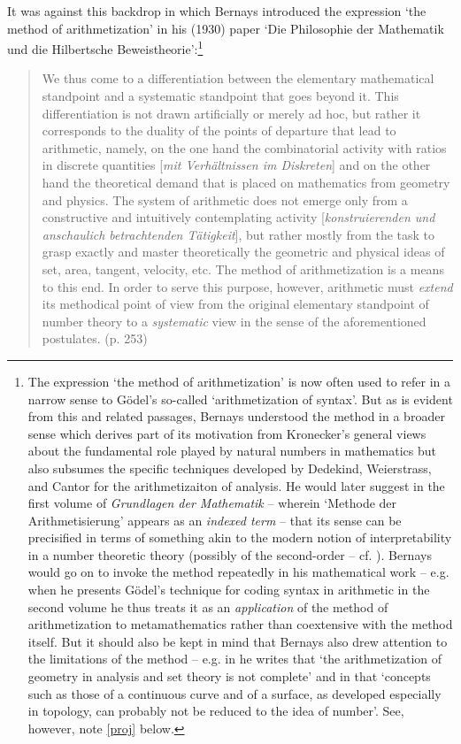 \documentclass[11pt,fleqn,leqno]{article}
\begin{document}
It was against this backdrop in which Bernays introduced the expression `the method of arithmetization' in his (1930) paper `Die Philosophie der Mathematik und die Hilbertsche Beweistheorie':\footnote{The expression `the method of arithmetization' is now often used to refer in a narrow sense to G\"odel's \citeyearpar{Godel1931a} so-called `arithmetization of syntax'.   But as is evident from this and related passages, Bernays understood the method in a broader sense which derives part of its motivation from Kronecker's general views about the fundamental role played by natural numbers in mathematics but also subsumes the specific techniques developed by Dedekind, Weierstrass, and Cantor for the arithmetizaiton of analysis.   He would later suggest in the first volume of \textsl{Grundlagen der Mathematik}  \citeyearpar[pp. 2-3, pp. 17-18]{Hilbert1934} -- wherein   `Methode der Arithmetisierung' appears as an \textsl{indexed term} -- that its sense can be precisified in terms of something akin to the modern notion of interpretability in a number theoretic theory (possibly of the second-order -- cf. \citealp[Sup. IV]{Hilbert1939}).   Bernays would go on to invoke the method repeatedly in his mathematical work -- e.g. when he presents G\"odel's  technique for coding syntax in arithmetic in the second volume \citeyearpar[\S 4]{Hilbert1939} he thus treats it as an \textsl{application} of the method of arithmetization to metamathematics rather than coextensive with the method itself.  But it should also be kept in mind that Bernays also drew attention to the limitations of the method -- e.g. in \citeyearpar[p. 152]{Bernays1941d} he writes that `the arithmetization of geometry in analysis and set theory is not complete' and in \citeyearpar[p. 65]{Bernays1970} that `concepts such as those of a continuous curve and of a surface, as developed especially in topology, can probably not be reduced to the idea of number'.  See, however, note \ref{proj} below.}
\begin{quote}
\footnotesize{We thus come to a differentiation between the elementary mathematical standpoint and a systematic standpoint that goes beyond it. This differentiation is not drawn artificially or merely ad hoc, but rather it corresponds to the duality of the points of departure that lead to arithmetic, namely, on the one hand the combinatorial activity with ratios in discrete quantities [\textsl{mit Verh\"altnissen im Diskreten}] and on the other hand the theoretical demand that is placed on mathematics from geometry and physics. The system of arithmetic does not emerge only from a constructive and intuitively contemplating activity [\textsl{konstruierenden und anschaulich betrachtenden T\"atigkeit}], but rather mostly from the task to grasp exactly and master theoretically the geometric and physical ideas of set, area, tangent, velocity, etc. The method of arithmetization is a means to this end.  In order to serve this purpose, however, arithmetic must \textsl{extend} its methodical point of view from the original elementary standpoint of number theory to a \textsl{systematic} view in the sense of the aforementioned postulates.  \hfill (p. 253)}
\end{quote}
\end{document}
